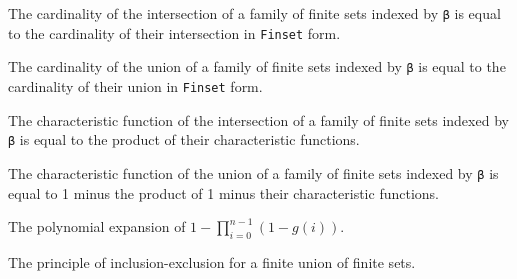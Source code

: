 \begin{lemma}\label{card_eq_FinInter}
  The cardinality of the intersection of a family of finite sets indexed by \verb|β| is equal to the cardinality of their intersection in \verb|Finset| form.
\end{lemma}

\begin{lemma}\label{card_eq_FinUnion}
  The cardinality of the union of a family of finite sets indexed by \verb|β| is equal to the cardinality of their union in \verb|Finset| form.
\end{lemma}

\begin{lemma}\label{char_fun_FinInter}
  The characteristic function of the intersection of a family of finite sets indexed by \verb|β| is equal to the product of their characteristic functions.
\end{lemma}

\begin{lemma}\label{char_fun_FinUnion}
  The characteristic function of the union of a family of finite sets indexed by \verb|β| is equal to 1 minus the product of 1 minus their characteristic functions.
\end{lemma}

\begin{lemma}\label{mul_expand₀}
  The polynomial expansion of \(1 - \prod_{i=0}^{n-1} (1 - g(i))\).
\end{lemma}

\begin{theorem}\label{Principle_of_Inclusion_Exclusion}
  The principle of inclusion-exclusion for a finite union of finite sets.
\end{theorem}

